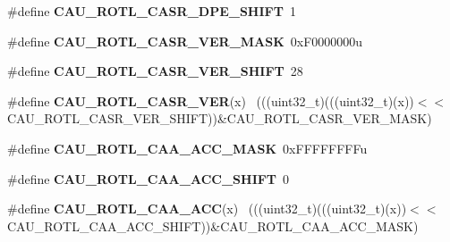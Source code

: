 \begin{DoxyCompactItemize}
\item 
\hypertarget{group___c_a_u___register___masks_ga4d0da6b7c4575317872d875392fb0272}{}\#define {\bfseries C\+A\+U\+\_\+\+R\+O\+T\+L\+\_\+\+C\+A\+S\+R\+\_\+\+D\+P\+E\+\_\+\+S\+H\+I\+F\+T}~1\label{group___c_a_u___register___masks_ga4d0da6b7c4575317872d875392fb0272}

\item 
\hypertarget{group___c_a_u___register___masks_ga6d8f0ea43478a075cf2a0c9745bd211c}{}\#define {\bfseries C\+A\+U\+\_\+\+R\+O\+T\+L\+\_\+\+C\+A\+S\+R\+\_\+\+V\+E\+R\+\_\+\+M\+A\+S\+K}~0x\+F0000000u\label{group___c_a_u___register___masks_ga6d8f0ea43478a075cf2a0c9745bd211c}

\item 
\hypertarget{group___c_a_u___register___masks_gad4f7b9dfa3900a1a24b391b7c515d0e4}{}\#define {\bfseries C\+A\+U\+\_\+\+R\+O\+T\+L\+\_\+\+C\+A\+S\+R\+\_\+\+V\+E\+R\+\_\+\+S\+H\+I\+F\+T}~28\label{group___c_a_u___register___masks_gad4f7b9dfa3900a1a24b391b7c515d0e4}

\item 
\hypertarget{group___c_a_u___register___masks_gace77155d58f01470fd3a1a8f24a82612}{}\#define {\bfseries C\+A\+U\+\_\+\+R\+O\+T\+L\+\_\+\+C\+A\+S\+R\+\_\+\+V\+E\+R}(x)                                      ~(((uint32\+\_\+t)(((uint32\+\_\+t)(x))$<$$<$C\+A\+U\+\_\+\+R\+O\+T\+L\+\_\+\+C\+A\+S\+R\+\_\+\+V\+E\+R\+\_\+\+S\+H\+I\+F\+T))\&C\+A\+U\+\_\+\+R\+O\+T\+L\+\_\+\+C\+A\+S\+R\+\_\+\+V\+E\+R\+\_\+\+M\+A\+S\+K)\label{group___c_a_u___register___masks_gace77155d58f01470fd3a1a8f24a82612}

\item 
\hypertarget{group___c_a_u___register___masks_ga0aa131c13271bf31c8f88c3c7dce8729}{}\#define {\bfseries C\+A\+U\+\_\+\+R\+O\+T\+L\+\_\+\+C\+A\+A\+\_\+\+A\+C\+C\+\_\+\+M\+A\+S\+K}~0x\+F\+F\+F\+F\+F\+F\+F\+Fu\label{group___c_a_u___register___masks_ga0aa131c13271bf31c8f88c3c7dce8729}

\item 
\hypertarget{group___c_a_u___register___masks_gac36dbf4828c435c589cbcee42b1356d3}{}\#define {\bfseries C\+A\+U\+\_\+\+R\+O\+T\+L\+\_\+\+C\+A\+A\+\_\+\+A\+C\+C\+\_\+\+S\+H\+I\+F\+T}~0\label{group___c_a_u___register___masks_gac36dbf4828c435c589cbcee42b1356d3}

\item 
\hypertarget{group___c_a_u___register___masks_ga17b09aa2b7f5cdb73ba25c3abb993b65}{}\#define {\bfseries C\+A\+U\+\_\+\+R\+O\+T\+L\+\_\+\+C\+A\+A\+\_\+\+A\+C\+C}(x)                                        ~(((uint32\+\_\+t)(((uint32\+\_\+t)(x))$<$$<$C\+A\+U\+\_\+\+R\+O\+T\+L\+\_\+\+C\+A\+A\+\_\+\+A\+C\+C\+\_\+\+S\+H\+I\+F\+T))\&C\+A\+U\+\_\+\+R\+O\+T\+L\+\_\+\+C\+A\+A\+\_\+\+A\+C\+C\+\_\+\+M\+A\+S\+K)\label{group___c_a_u___register___masks_ga17b09aa2b7f5cdb73ba25c3abb993b65}


\end{DoxyCompactItemize}
